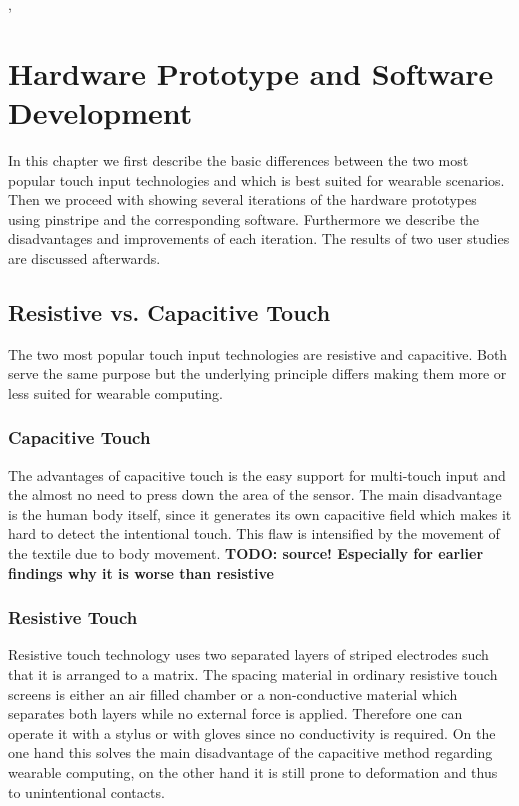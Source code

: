 ,%
%

\chapter{Hardware Prototype and Software Development}
\label{Hardware Prototype and Software Development} 
In this chapter we first describe the basic differences between the two most popular touch input technologies and which is best suited for wearable scenarios. Then we proceed with showing several iterations of the hardware prototypes using pinstripe and the corresponding software. Furthermore we describe the disadvantages and improvements of each iteration. The results of two user studies are discussed afterwards. 
\section{Resistive vs. Capacitive Touch}
The two most popular touch input technologies are resistive and capacitive. Both serve the same purpose but the underlying principle differs making them more or less suited for wearable computing. 
\subsection{Capacitive Touch}

The advantages of capacitive touch is the easy support for multi-touch input and the almost no need to press down the area of the sensor. The main disadvantage is the human body itself, since  it generates its own capacitive field which makes it hard to detect the intentional touch. This flaw is intensified by the movement of the textile due to body movement. \textbf{TODO: source! Especially for earlier findings why it is worse than resistive}

\subsection{Resistive Touch}
Resistive touch technology uses two separated layers of striped electrodes such that it is arranged to a matrix. The spacing material in ordinary resistive touch screens is either an air filled chamber or a non-conductive material which separates both layers while no external force is applied. Therefore one can operate it with a stylus or with gloves since no conductivity is required. On the one hand this solves the main disadvantage of the capacitive method regarding wearable computing, on the other hand it is still prone to deformation and thus to unintentional contacts.

